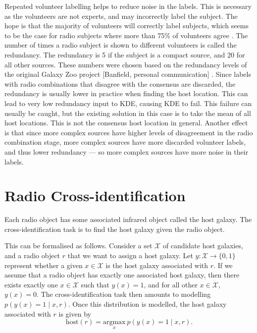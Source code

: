 \documentclass[11pt]{book}
\begin{document}
    Repeated volunteer labelling helps to reduce noise in the labels. This is necessary as the volunteers are not experts, and may incorrectly label the subject. The hope is that the majority of volunteers will correctly label subjects, which seems to be the case for radio subjects where more than 75\% of volunteers agree \cite{banfield15}. The number of times a radio subject is shown to different volunteers is called the redundancy. The redundancy is 5 if the subject is a compact source, and 20 for all other sources. These numbers were chosen based on the redundancy levels of the original Galaxy Zoo project [Banfield, personal communication] . Since labels with radio combinations that disagree with the consensus are discarded, the redundancy is usually lower in practice when finding the host location. This can lead to very low redundancy input to KDE, causing KDE to fail. This failure can usually be caught, but the existing solution in this case is to take the mean of all host locations. This is not the consensus host location in general. Another effect is that since more complex sources have higher levels of disagreement in the radio combination stage, more complex sources have more discarded volunteer labels, and thus lower redundancy --- so more complex sources have more noise in their labels.

\section{Radio Cross-identification}
\label{sec:cross-identification}

    Each radio object has some associated infrared object called the host galaxy. The cross-identification task is to find the host galaxy given the radio object.
    
    This can be formalised as follows. Consider a set $\mathcal X$ of candidate host galaxies, and a radio object $r$ that we want to assign a host galaxy. Let $y : \mathcal X \to \{0, 1\}$ represent whether a given $x \in \mathcal X$ is the host galaxy associated with $r$. If we assume that a radio object has exactly one associated host galaxy, then there exists exactly one $x \in \mathcal X$ such that $y(x) = 1$, and for all other $x \in \mathcal X$, $y(x) = 0$. The cross-identification task then amounts to modelling $p(y(x) = 1 \mid x, r)$. Once this distribution is modelled, the host galaxy associated with $r$ is given by
    \begin{equation}
        \label{eq:cross-identification}
        \mbox{host}(r) = \underset{x}{\mbox{argmax}}\ p(y(x) = 1 \mid x, r).
    \end{equation}
\end{document}
